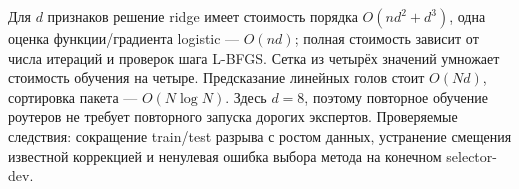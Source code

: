 Для $d$ признаков решение ridge имеет стоимость порядка
$O(nd^2+d^3)$, одна оценка функции/градиента logistic --- $O(nd)$;
полная стоимость зависит от числа итераций и проверок шага L-BFGS.
Сетка из четырёх значений умножает стоимость обучения на четыре.
Предсказание линейных голов стоит $O(Nd)$, сортировка пакета ---
$O(N\log N)$. Здесь $d=8$, поэтому повторное обучение роутеров
не требует повторного запуска дорогих экспертов.
Проверяемые следствия: сокращение train/test разрыва с ростом данных,
устранение смещения известной коррекцией и ненулевая ошибка выбора
метода на конечном selector-dev.

